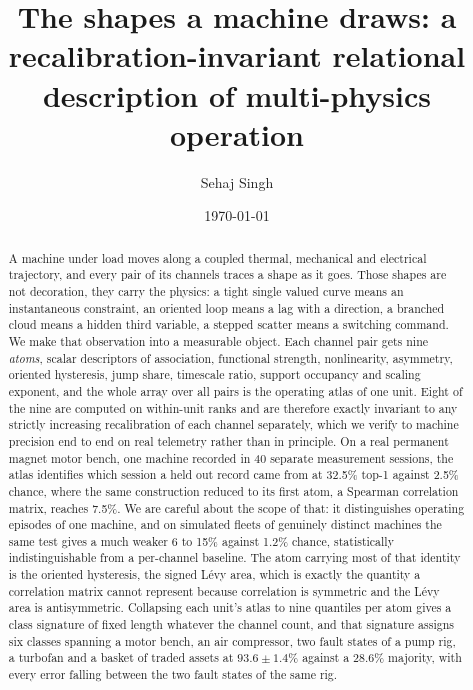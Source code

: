 \documentclass[11pt]{article}
\title{\bf The shapes a machine draws: a recalibration-invariant relational
description of multi-physics operation}
\author{Sehaj Singh}
\date{\today}
\begin{document}
\maketitle

\begin{abstract}
\noindent
A machine under load moves along a coupled thermal, mechanical and electrical
trajectory, and every pair of its channels traces a shape as it goes. Those
shapes are not decoration, they carry the physics: a tight single valued curve
means an instantaneous constraint, an oriented loop means a lag with a
direction, a branched cloud means a hidden third variable, a stepped scatter
means a switching command. We make that observation into a measurable object.
Each channel pair gets nine \emph{atoms}, scalar descriptors of association,
functional strength, nonlinearity, asymmetry, oriented hysteresis, jump share,
timescale ratio, support occupancy and scaling exponent, and the whole array
over all pairs is the operating atlas of one unit. Eight of the nine are
computed on within-unit ranks and are therefore exactly invariant to any
strictly increasing recalibration of each channel separately, which we verify
to machine precision end to end on real telemetry rather than in principle.
On a real permanent magnet motor bench, one machine recorded in 40 separate
measurement sessions, the atlas identifies which session a held out record came
from at 32.5\% top-1 against 2.5\% chance, where the same construction reduced
to its first atom, a Spearman correlation matrix, reaches 7.5\%. We are careful
about the scope of that: it distinguishes operating episodes of one machine, and
on simulated fleets of genuinely distinct machines the same test gives a much
weaker 6 to 15\% against 1.2\% chance, statistically indistinguishable from a
per-channel baseline. The atom carrying most of that identity is
the oriented hysteresis, the signed L\'evy area, which is exactly the quantity
a correlation matrix cannot represent because correlation is symmetric and the
L\'evy area is antisymmetric. Collapsing each unit's atlas to nine quantiles
per atom gives a class signature of fixed length whatever the channel count,
and that signature assigns six classes spanning a motor bench, an air
compressor, two fault states of a pump rig, a turbofan and a basket of traded
assets at $93.6\pm1.4\%$ against a $28.6\%$ majority, with every error falling
between the two fault states of the same rig.


\end{abstract}
\end{document}
